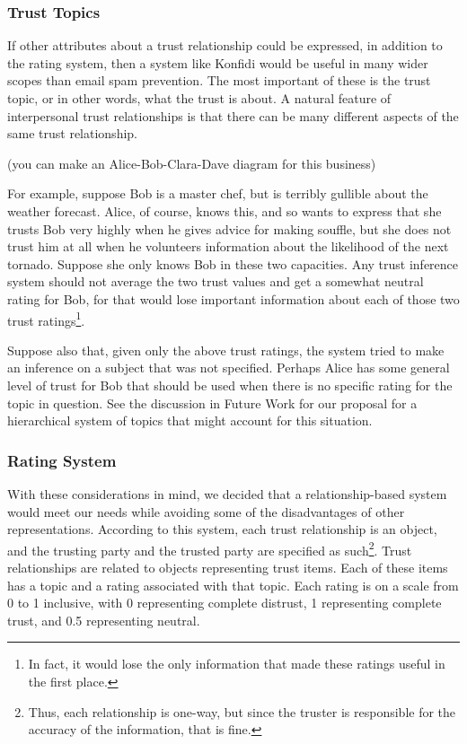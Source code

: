 \documentclass[onecolumn]{acm_proc_article-sp}
\begin{document}
\subsubsection{Trust Topics}
If other attributes about a trust relationship could be expressed, in addition to the rating system, then a system like Konfidi would be useful in many wider scopes than email spam prevention.  The most important of these is the trust topic, or in other words, what the trust is about.  A natural feature of interpersonal trust relationships is that there can be many different aspects of the same trust relationship.  

(you can make an Alice-Bob-Clara-Dave diagram for this business)

For example, suppose Bob is a master chef, but is terribly gullible about the weather forecast.  Alice, of course, knows this, and so wants to express that she trusts Bob very highly when he gives advice for making souffle, but she does not trust him at all when he volunteers information about the likelihood of the next tornado.  Suppose she only knows Bob in these two capacities.  Any trust inference system should not average the two trust values and get a somewhat neutral rating for Bob, for that would lose important information about each of those two trust ratings\footnote{In fact, it would lose the only information that made these ratings useful in the first place.}.

Suppose also that, given only the above trust ratings, the system tried to make an inference on a subject that was not specified.  Perhaps Alice has some general level of trust for Bob that should be used when there is no specific rating for the topic in question.  See the discussion in Future Work for our proposal for a hierarchical system of topics that might account for this situation.

\subsubsection{Rating System}
With these considerations in mind, we decided that a relationship-based system would meet our needs while avoiding some of the disadvantages of other representations.  According to this system, each trust relationship is an object, and the trusting party and the trusted party are specified as such\footnote{Thus, each relationship is one-way, but since the truster is responsible for the accuracy of the information, that is fine.}.  Trust relationships are related to objects representing trust items.  Each of these items has a topic and a rating associated with that topic.  Each rating is on a scale from 0 to 1 inclusive, with 0 representing complete distrust, 1 representing complete trust, and 0.5 representing neutral.
\end{document}
